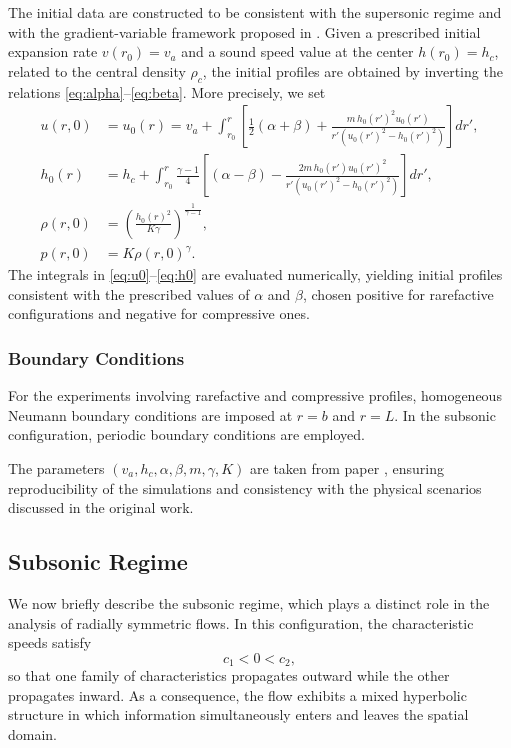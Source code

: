 \documentclass[11pt]{article}
\begin{document}
The initial data are constructed to be consistent with the supersonic regime and with the gradient-variable framework proposed in \cite{F1}. Given a prescribed initial expansion rate \(v(r_{0}) = v_{a}\) and a sound speed value at the center \(h(r_{0}) = h_{c}\), related to the central density \(\rho_{c}\), the initial profiles are obtained by inverting the relations \eqref{eq:alpha}–\eqref{eq:beta}. More precisely, we set
\begin{align}
    u(r,0) & = u_{0}(r) = v_{a} + \int_{r_{0}}^{r}\left[\frac{1}{2}(\alpha+\beta)
    +\frac{m\,h_{0}(r')^{2}u_{0}(r')}{r'\left(u_{0}(r')^{2}-h_{0}(r')^{2}\right)}\right]dr', \label{eq:u0}\\[6pt]
    h_{0}(r) & = h_{c} + \int_{r_{0}}^{r}\frac{\gamma-1}{4}\left[(\alpha-\beta)
    -\frac{2m\,h_{0}(r')u_{0}(r')^{2}}{r'\left(u_{0}(r')^{2}-h_{0}(r')^{2}\right)}\right]dr', \label{eq:h0}\\[6pt]
    \rho(r,0) & = \left(\frac{h_{0}(r)^{2}}{K\gamma}\right)^{\frac{1}{\gamma-1}}, \label{eq:rho0}\\[6pt]
    p(r,0) & = K\rho(r,0)^{\gamma}. \label{eq:p0}
\end{align}
The integrals in \eqref{eq:u0}–\eqref{eq:h0} are evaluated numerically, yielding initial profiles consistent with the prescribed values of \(\alpha\) and \(\beta\), chosen positive for rarefactive configurations and negative for compressive ones.

\subsubsection{Boundary Conditions}

For the experiments involving rarefactive and compressive profiles, homogeneous Neumann boundary conditions are imposed at \(r=b\) and \(r=L\). In the subsonic configuration, periodic boundary conditions are employed.

The parameters \((v_{a}, h_{c}, \alpha, \beta, m, \gamma, K)\) are taken from paper \cite{F1}, ensuring reproducibility of the simulations and consistency with the physical scenarios discussed in the original work.


\subsection{Subsonic Regime}

We now briefly describe the subsonic regime, which plays a distinct role in the analysis of radially symmetric flows. In this configuration, the characteristic speeds satisfy
\[
c_1 < 0 < c_2,
\]
so that one family of characteristics propagates outward while the other propagates inward. As a consequence, the flow exhibits a mixed hyperbolic structure in which information simultaneously enters and leaves the spatial domain.
\end{document}
